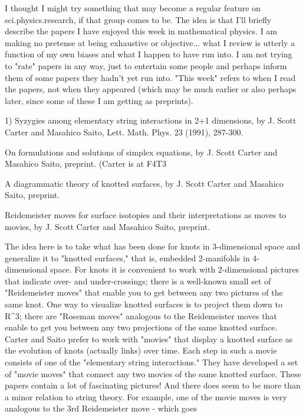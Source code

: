 
I thought I might try something that may become a regular feature
on sci.physics.research, if that group comes to be.   The idea is that
I'll briefly describe the papers I have enjoyed this week in mathematical 
physics.   I am making no pretense at being exhaustive or objective... 
what I review is utterly a function of my own biases and what I happen to
have run into.  I am not trying to "rate" papers in any way, just to
entertain some people and perhaps inform them of some papers they hadn't 
yet run into.  "This week" refers to when I read the papers, not when they 
appeared (which may be much earlier or also perhaps later, since some of these
I am getting as preprints).  

1)  Syzygies among elementary string interactions in 2+1 dimensions,
by J. Scott Carter and Masahico Saito, Lett. Math. Phys. 23 (1991), 
287-300.

On formulations and solutions of simplex equations, by J. Scott Carter and 
Masahico Saito, preprint.  (Carter is at 
F4T3%

A diagrammatic theory of knotted surfaces, by J. Scott Carter and 
Masahico Saito, preprint.

Reidemeister moves for surface isotopies and their interpretations as moves
to movies, by J. Scott Carter and Masahico Saito, preprint.

The idea here is to take what has been done for knots in 3-dimensional
space and generalize it to "knotted surfaces," that is, embedded 2-manifolds
in 4-dimensional space.  For knots it is convenient to work with 2-dimensional
pictures that indicate over- and under-crossings; there is a well-known
small set of "Reidemeister moves" that enable you to get between any two
pictures of the same knot.  One way to visualize knotted surfaces is
to project them down to R^3; there are "Roseman moves" analogous to the
Reidemeister moves that enable to get you between any two projections
of the same knotted surface.  Carter and Saito prefer to work with
"movies" that display a knotted surface as the evolution of knots
(actually links) over time. Each step in such a movie consists of one of
the "elementary string interactions."    They have developed a set of
"movie moves" that connect any two movies of the same knotted surface.
These papers contain a lot of fascinating pictures!  And there does seem
to be more than a minor relation to string theory.  For example, one of
the movie moves is very analogous to the 3rd Reidemeister move - which goes













